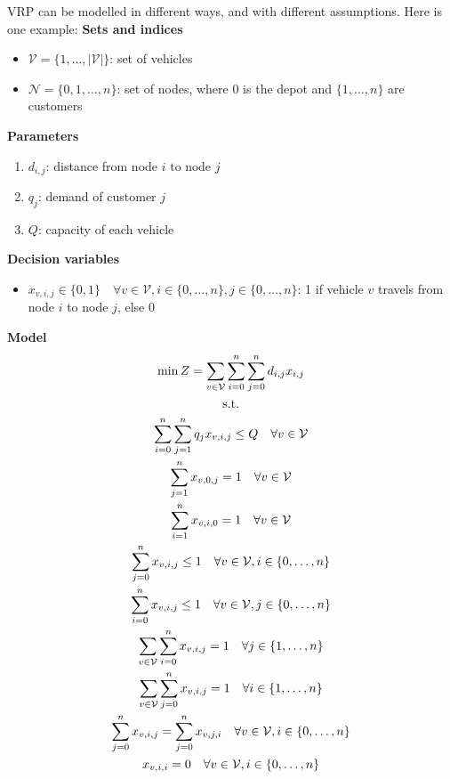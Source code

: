 \documentclass[10pt]{article}
\begin{document}
VRP can be modelled in different ways, and with different assumptions. Here is one example: 
\textbf{Sets and indices}
\begin{itemize}
    \item $\mathcal{V} = \{1, \dots, |\mathcal{V}|\} $: set of vehicles 
    \item $\mathcal{N} = \{0, 1, \dots, n\} $: set of nodes, where 0 is the depot and $\{1, \dots, n\} $ are customers 
\end{itemize}
\textbf{Parameters}
\begin{enumerate}
    \item $d_{i, j} $: distance from node $i \text{ to node } j $
    \item $q_j $: demand of customer $j $
    \item $Q $: capacity of each vehicle 
\end{enumerate}
\textbf{Decision variables} 
\begin{itemize}
    \item $x_{v, i, j} \in \{0, 1\} \quad\forall v\in \mathcal{V}, i\in \{0,\dots, n\}, j\in \{0,\dots, n\} $: 1 if vehicle $v $ travels from node $i $ to node $j $, else 0
\end{itemize}
\textbf{Model}
\begin{gather}
    \min Z = \sum_{v\in \mathcal{V}}\sum_{i = 0}^n\sum_{j = 0}^{n}d_{i, j}x_{i, j}\notag\\
    \text{s.t.}\notag\\
    \sum_{i = 0}^{n}\sum_{j = 1}^{n}q_jx_{v, i, j}\le Q\quad\forall v\in \mathcal{V}\\
    \sum_{j = 1}^{n}x_{v, 0, j} = 1\quad\forall v\in \mathcal{V}\\
    \sum_{i = 1}^{n}x_{v, i, 0} = 1\quad\forall v\in \mathcal{V}\\
    \sum_{j = 0}^{n}x_{v, i, j}\le 1\quad\forall v\in \mathcal{V}, i\in \{0, \dots, n\}\\
    \sum_{i = 0}^{n}x_{v, i, j}\le 1\quad\forall v\in \mathcal{V}, j\in \{0, \dots, n\}\\
    \sum_{v\in \mathcal{V}}\sum_{i = 0}^{n}x_{v, i, j} = 1\quad\forall j\in\{1,\dots, n\}\\
    \sum_{v\in \mathcal{V}}\sum_{j = 0}^{n}x_{v, i, j} = 1\quad\forall i\in\{1,\dots, n\}\\
    \sum_{j = 0}^{n}x_{v, i, j} = \sum_{j = 0}^{n}x_{v, j, i}\quad\forall v\in \mathcal{V}, i\in\{0, \dots, n\}\\
    x_{v, i, i} = 0 \quad\forall v\in \mathcal{V}, i\in \{0, \dots, n\}
\end{gather}
\newpage 
\end{document}
